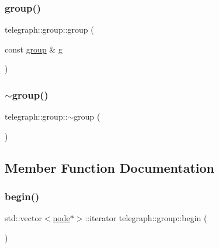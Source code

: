 \subsubsection{\texorpdfstring{group()}{group()}\hspace{0.1cm}{\footnotesize\ttfamily [2/2]}}
{\footnotesize\ttfamily telegraph\+::group\+::group (\begin{DoxyParamCaption}\item[{const \hyperlink{classtelegraph_1_1group}{group} \&}]{g }\end{DoxyParamCaption})\hspace{0.3cm}{\ttfamily [inline]}}

\mbox{\label{classtelegraph_1_1group_a2c613f213d32b7b48b94df99610bbc90}} 
\subsubsection{\texorpdfstring{$\sim$group()}{~group()}}
{\footnotesize\ttfamily telegraph\+::group\+::$\sim$group (\begin{DoxyParamCaption}{ }\end{DoxyParamCaption})\hspace{0.3cm}{\ttfamily [inline]}}



\subsection{Member Function Documentation}
\mbox{\label{classtelegraph_1_1group_a71c8576e9cf6035fd371516b1e1fc692}} 
\subsubsection{\texorpdfstring{begin()}{begin()}\hspace{0.1cm}{\footnotesize\ttfamily [1/2]}}
{\footnotesize\ttfamily std\+::vector$<$\hyperlink{classtelegraph_1_1node}{node}$\ast$$>$\+::iterator telegraph\+::group\+::begin (\begin{DoxyParamCaption}{ }\end{DoxyParamCaption})\hspace{0.3cm}{\ttfamily [inline]}}


